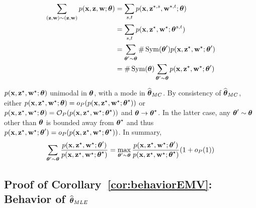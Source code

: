 \begin{align*}
  \sum_{(\bz, \bw) \sim (\bz, \bw)} \prob(\bx, \bz, \bw; \btheta) & = \sum_{s, t} \prob(\bx, \bz^{\vrai, s}, \bw^{\vrai, t}; \btheta) \\ 
  & = \sum_{s, t} \prob(\bx, \bzs, \bws; \btheta^{s,t}) \\ 
  & = \sum_{\btheta' \sim \btheta} \# \Symmetric(\btheta') \prob(\bx, \bzs, \bws; \btheta') \\ 
  & = \# \Symmetric(\btheta) \sum_{\btheta' \sim \btheta} \prob(\bx, \bzs, \bws; \btheta') \\ 
\end{align*}

$\prob(\bx, \bzs, \bws; \btheta)$ unimodal in $\btheta$, with a mode in $\bthetaMC$. By consistency of $\bthetaMC$, either $\prob(\bx, \bzs, \bws; \btheta) = \smallO_P(\prob(\bx, \bzs, \bws; \bthetas))$ or $\prob(\bx, \bzs, \bws; \btheta) = \bigO_P(\prob(\bx, \bzs, \bws; \bthetas))$ and $\btheta \to \bthetas$. In the latter case, any $\btheta' \sim \btheta$ other than $\btheta$ is bounded away from $\bthetas$ and thus $\prob(\bx, \bzs, \bws; \btheta') = \smallO_P(\prob(\bx, \bzs, \bws; \bthetas))$. In summary, 
\[
 \sum_{\btheta' \sim \btheta} \frac{\prob(\bx, \bzs, \bws; \btheta')}{\prob(\bx, \bzs, \bws; \bthetas)} = \max_{\btheta' \sim \btheta} \frac{\prob(\bx, \bzs, \bws; \btheta')}{\prob(\bx, \bzs, \bws; \bthetas)} (1 + \smallO_P(1))
\] \proofend

\subsection{Proof of Corollary~\ref{cor:behaviorEMV}: Behavior of $\bthetaEMV$}
\label{annexe:cor:behaviorEMV}

%

